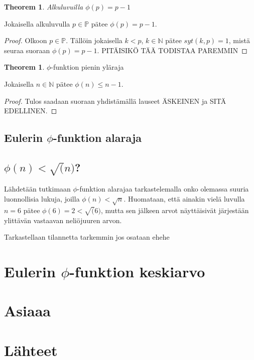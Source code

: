 \documentclass{article}
\theoremstyle{definition}
\newtheorem{theorem}[subsection]{Theorem}
\begin{document}
\begin{theorem}{\emph{Alkuluvuilla $\phi(p)=p-1$}}

Jokaisella alkuluvulla $p\in\mathbb{P}$ pätee $\phi(p)=p-1$.

\begin{proof}

Olkoon $p\in\mathbb{P}$. Tällöin jokaisella $k<p$, $k\in\mathbb{N}$ pätee $syt(k, p)=1$, mistä seuraa suoraan $\phi(p)=p-1$. PITÄISIKÖ TÄÄ TODISTAA PAREMMIN

\end{proof}

\end{theorem}

\begin{theorem}{$\phi$-funktion pienin yläraja}

Jokaisella $n \in \mathbb{N}$ pätee $\phi(n)\leq {n-1}$.

\begin{proof}

Tulos saadaan suoraan yhdistämällä lauseet ÄSKEINEN ja SITÄ EDELLINEN.

\end{proof}

\end{theorem}

\subsection{Eulerin $\phi$-funktion alaraja}

\subsection{$\phi(n) < \sqrt(n)$?}

Lähdetään tutkimaan $\phi$-funktion alarajaa tarkastelemalla onko olemassa suuria luonnollisia lukuja, joilla $\phi(n) < \sqrt{n}$. Huomataan, että ainakin vielä luvulla $n=6$ pätee $\phi(6)=2<\sqrt(6)$, mutta sen jälkeen arvot näyttäisivät järjestään ylittävän vastaavan neliöjuuren arvon.

Tarkastellaan tilannetta tarkemmin jos osataan ehehe

\section{Eulerin $\phi$-funktion keskiarvo}

\section{Asiaaa}

\section{Lähteet}

\printbibliography[heading=none]
\end{document}
